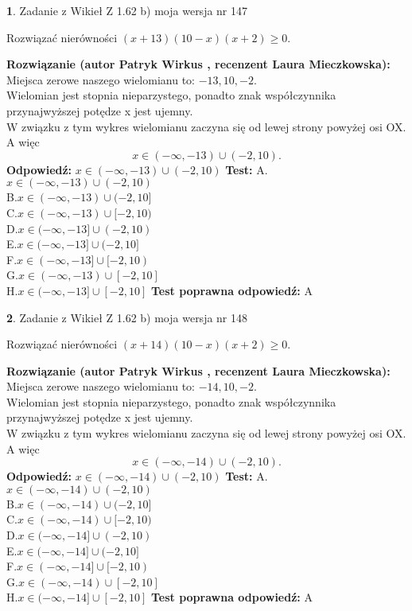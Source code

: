 \documentclass[12pt, a4paper]{article}
\theoremstyle{definition} %
\newtheorem{zad}{}
\newcommand{\zadStart}[1]{\begin{zad}#1\newline}
\newcommand{\zadStop}{\end{zad}}
\newcommand{\rozwStart}[2]{\noindent \textbf{Rozwiązanie (autor #1 , recenzent #2): }\newline}
\newcommand{\rozwStop}{\newline}
\newcommand{\odpStart}{\noindent \textbf{Odpowiedź:}\newline}
\newcommand{\odpStop}{\newline}
\newcommand{\testStart}{\noindent \textbf{Test:}\newline}
\newcommand{\testStop}{\newline}
\newcommand{\kluczStart}{\noindent \textbf{Test poprawna odpowiedź:}\newline}
\newcommand{\kluczStop}{\newline}
\begin{document}
\zadStart{Zadanie z Wikieł Z 1.62 b) moja wersja nr 147}

Rozwiązać nierówności $(x+13)(10-x)(x+2)\ge0$.
\zadStop
\rozwStart{Patryk Wirkus}{Laura Mieczkowska}
Miejsca zerowe naszego wielomianu to: $-13, 10, -2$.\\
Wielomian jest stopnia nieparzystego, ponadto znak współczynnika przy\linebreak najwyższej potędze x jest ujemny.\\ W związku z tym wykres wielomianu zaczyna się od lewej strony powyżej osi OX. A więc $$x \in (-\infty,-13) \cup (-2,10).$$
\rozwStop
\odpStart
$x \in (-\infty,-13) \cup (-2,10)$
\odpStop
\testStart
A.$x \in (-\infty,-13) \cup (-2,10)$\\
B.$x \in (-\infty,-13) \cup (-2,10]$\\
C.$x \in (-\infty,-13) \cup [-2,10)$\\
D.$x \in (-\infty,-13] \cup (-2,10)$\\
E.$x \in (-\infty,-13] \cup (-2,10]$\\
F.$x \in (-\infty,-13] \cup [-2,10)$\\
G.$x \in (-\infty,-13) \cup [-2,10]$\\
H.$x \in (-\infty,-13] \cup [-2,10]$
\testStop
\kluczStart
A
\kluczStop



\zadStart{Zadanie z Wikieł Z 1.62 b) moja wersja nr 148}

Rozwiązać nierówności $(x+14)(10-x)(x+2)\ge0$.
\zadStop
\rozwStart{Patryk Wirkus}{Laura Mieczkowska}
Miejsca zerowe naszego wielomianu to: $-14, 10, -2$.\\
Wielomian jest stopnia nieparzystego, ponadto znak współczynnika przy\linebreak najwyższej potędze x jest ujemny.\\ W związku z tym wykres wielomianu zaczyna się od lewej strony powyżej osi OX. A więc $$x \in (-\infty,-14) \cup (-2,10).$$
\rozwStop
\odpStart
$x \in (-\infty,-14) \cup (-2,10)$
\odpStop
\testStart
A.$x \in (-\infty,-14) \cup (-2,10)$\\
B.$x \in (-\infty,-14) \cup (-2,10]$\\
C.$x \in (-\infty,-14) \cup [-2,10)$\\
D.$x \in (-\infty,-14] \cup (-2,10)$\\
E.$x \in (-\infty,-14] \cup (-2,10]$\\
F.$x \in (-\infty,-14] \cup [-2,10)$\\
G.$x \in (-\infty,-14) \cup [-2,10]$\\
H.$x \in (-\infty,-14] \cup [-2,10]$
\testStop
\kluczStart
A
\kluczStop
\end{document}
